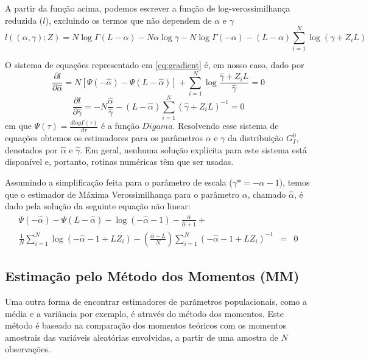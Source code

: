 \documentclass[12pt]{article}
\begin{document}
A partir da função acima, podemos escrever a função de log-verossimilhança reduzida ($l$), excluindo os termos que não dependem de $\alpha$ e $\gamma$
\begin{equation}
    l((\alpha, \gamma); Z) = N\log\Gamma(L-\alpha) - N\alpha \log\gamma - N\log\Gamma(-\alpha) - (L-\alpha)\sum_{i=1}^{N}\log(\gamma +Z_iL) \label{eq:logVerRed}
\end{equation}

O sistema de equações representado em \eqref{eq:gradient} é, em nosso caso, dado por
\begin{equation}
  \frac{\partial l}{\partial \hat{\alpha}} = N[\Psi(-\hat{\alpha}) - \Psi(L-\hat{\alpha})] + \sum_{i=1}^{N}\log\frac{\hat{\gamma} + Z_iL}{\hat{\gamma}} = 0
\end{equation}
\begin{equation}
   \frac{\partial l}{\partial \hat{\gamma}} = -N\frac{\hat{\alpha}}{\hat{\gamma}} - (L - \hat{\alpha})\sum_{i=1}^{N}(\hat{\gamma} + Z_iL)^{-1} = 0
\end{equation}
em que $\Psi(\tau) = \frac{\textit{d}log\Gamma(\tau)}{\textit{d}\tau}$ é a função $Digama$. Resolvendo esse sistema de equações obtemos os estimadores para os parâmetros $\alpha$ e $\gamma$ da distribuição $G_I^0$, denotados por $\hat{\alpha}$ e $\hat{\gamma}$. Em geral, nenhuma solução explícita para este sistema está disponível e, portanto, rotinas numéricas têm que ser usadas.

Assumindo a simplificação feita para o parâmetro de escala ($\gamma* = -\alpha - 1$), temos que o estimador de Máxima Verossimilhança para o parâmetro $\alpha$, chamado $\hat{\alpha}$, é dado pela solução da seguinte equação não linear:
\begin{eqnarray}
    \Psi(-\hat{\alpha}) - \Psi(L-\hat{\alpha}) - \log(-\hat{\alpha}-1) - \frac{\hat{\alpha}}{\hat{\alpha}+1} + \nonumber \\ \frac{1}{N}\sum_{i=1}^{N}\log(-\hat{\alpha} - 1 + LZ_i) - \left ( \frac{\hat{\alpha}-L}{N} \right )\sum_{i=1}^{N}(-\hat{\alpha} - 1 + LZ_i)^{-1} & = & 0
\end{eqnarray}

\subsection{Estimação pelo Método dos Momentos (MM)}

Uma outra forma de encontrar estimadores de parâmetros populacionais, como a média e a variância por exemplo, é através do método dos momentos. Este método é baseado na comparação dos momentos teóricos com os momentos amostrais das variáveis aleatórias envolvidas, a partir de uma amostra de $N$ observações.
\end{document}
